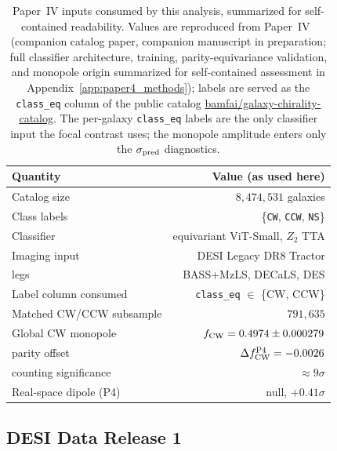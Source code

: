 \documentclass[aps,prd,twocolumn,superscriptaddress,showpacs,preprintnumbers,nofootinbib,longbibliography,floatfix]{revtex4-2}
\newcommand{\paperIVarxiv}{companion manuscript in preparation}
\begin{document}
\begin{table}[!htbp]
\caption{Paper~IV inputs consumed by this analysis, summarized for
self-contained readability. Values are reproduced from
Paper~IV~\cite{golden_chirality_2026} (companion catalog paper, \paperIVarxiv;
full classifier architecture, training, parity-equivariance validation, and monopole
origin summarized for self-contained assessment in
Appendix~\ref{app:paper4_methods});
labels are served as the \texttt{class\_eq} column of the public catalog
\href{https://huggingface.co/datasets/bamfai/galaxy-chirality-catalog}{bamfai/galaxy-chirality-catalog}.
The per-galaxy \texttt{class\_eq} labels are the only classifier input the
focal contrast uses; the monopole amplitude enters
only the $\sigma_{\rm pred}$ diagnostics.}
\label{tab:p4_inputs}
\begin{ruledtabular}
\footnotesize
\begin{tabular}{lr}
Quantity & Value (as used here) \\
\hline
Catalog size & $8{,}474{,}531$ galaxies \\
Class labels & \{\texttt{CW}, \texttt{CCW}, \texttt{NS}\} \\
Classifier & equivariant ViT-Small, $Z_2$ TTA \\
Imaging input & DESI Legacy DR8 Tractor \\
\quad legs & BASS+MzLS, DECaLS, DES \\
Label column consumed & \texttt{class\_eq} $\in$ \{CW, CCW\} \\
Matched CW/CCW subsample & $791{,}635$ \\
Global CW monopole & $f_{\rm CW} = 0.4974 \pm 0.000279$ \\
\quad parity offset & $\Delta f_{\rm CW}^{\rm P4}=-0.0026$ \\
\quad counting significance & ${\approx}9\sigma$ \\
Real-space dipole (P4) & null, $+0.41\sigma$ \\
\end{tabular}
\end{ruledtabular}
\end{table}

\subsection{DESI Data Release 1}
\end{document}

